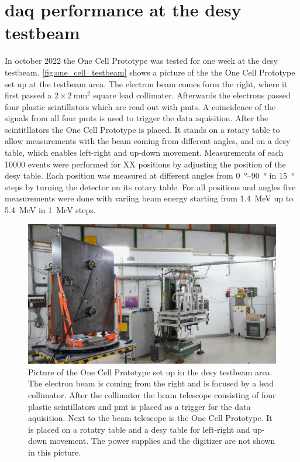 \chapter{\ac{daq} performance at the \ac{desy} testbeam}
In october 2022 the One Cell Prototype was tested for one week at the \ac{desy} testbeam.
\autoref{fig:one_cell_testbeam} shows a picture of the the One Cell Prototype set up at the testbeam area.
The electron beam comes form the right, where it first passed a $2\times\SI{2}{\milli\meter\squared}$ square lead collimater.
Afterwards the electrons passed four plastic scintillators which are read out with \acp{pmt}.
A coincidence of the signals from all four \acp{pmt} is used to trigger the data aquisition.
After the scintitllators the One Cell Prototype is placed.
It stands on a rotary table to allow measurements with the beam coming from different angles, and on a \ac{desy} table, which enables left-right and up-down movement.
Measurements of each \num{10000} events were performed for XX positions by adjusting the position of the \ac{desy} table.
Each position was measured at different angles from \SIrange{0}{90}{\degree} in \SI{15}{\degree} steps by turning the detector on its rotary table.
For all positions and angles five measurements were done with variing beam energy starting from \SI{1.4}{\mega\electronvolt} up to \SI{5.4}{\mega\electronvolt} in \SI{1}{\mega\electronvolt} steps.
\begin{figure}
	\centering
	\includegraphics[width=1.\textwidth]{pictures/one_cell_testbeam}
	\caption[One Cell Prototype at the \ac{desy} testbeam]{Picture of the One Cell Prototype set up in the \ac{desy} testbeam area. The electron beam is coming from the right and is focused by a lead collimator. After the collimator the beam telescope consisting of four plastic scintillators and \ac{pmt} is placed as a trigger for the data aquisition. Next to the beam telescope is the One Cell Prototype. It is placed on a rotatry table and a \ac{desy} table for left-right and up-down movement. The power supplies and the digitizer are not shown in this picture.}
	\label{fig:one_cell_testbeam}
\end{figure}

